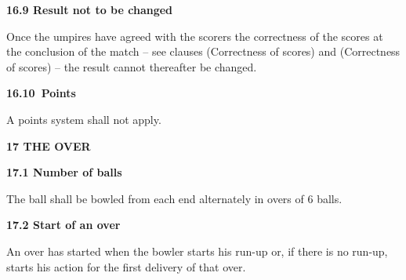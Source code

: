 \documentclass[12pt]{article}
\begin{document}
\vspace{\baselineskip}
{\fontsize{11pt}{13.2pt}\selectfont \textbf{16.9 \tabto{0.47in} Result not to be changed}\par}\par


\vspace{\baselineskip}
\begin{adjustwidth}{0.0in}{0.19in}
{\fontsize{9pt}{10.8pt}\selectfont Once the umpires have agreed with the scorers the correctness of the scores at the conclusion of the match – see clauses (Correctness of scores) and (Correctness of scores) – the result cannot thereafter be changed.\par}\par

\end{adjustwidth}


\vspace{\baselineskip}
{\fontsize{11pt}{13.2pt}\selectfont \textbf{16.10\  Points}\par}\par


\vspace{\baselineskip}
{\fontsize{9pt}{10.8pt}\selectfont A points system shall not apply.\par}\par


\vspace{\baselineskip}
{\fontsize{16pt}{19.2pt}\selectfont \textbf{17 THE OVER}\par}\par


\vspace{\baselineskip}
{\fontsize{11pt}{13.2pt}\selectfont \textbf{17.1 \tabto{0.47in} Number of balls}\par}\par


\vspace{\baselineskip}
{\fontsize{9pt}{10.8pt}\selectfont The ball shall be bowled from each end alternately in overs of 6 balls.\par}\par


\vspace{\baselineskip}
{\fontsize{11pt}{13.2pt}\selectfont \textbf{17.2 \tabto{0.47in} Start of an over}\par}\par


\vspace{\baselineskip}
\begin{adjustwidth}{0.0in}{0.08in}
{\fontsize{9pt}{10.8pt}\selectfont An over has started when the bowler starts his run-up or, if there is no run-up, starts his action for the first delivery of that over.\par}\par

\end{adjustwidth}
\end{document}

